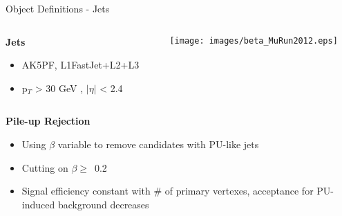 \documentclass{beamer}
\begin{document}
\begin{frame}{Object Definitions - Jets}
  \begin{columns}
    \begin{column}{0.4\textwidth}
      {\bf Jets}
      \begin{itemize}
      \item
        AK5PF, L1FastJet+L2+L3  %
      \item
        p$_{T}$ > 30 GeV , $|\eta|$ < 2.4
      \end{itemize}
    \end{column}
    
    \begin{column}{0.6\textwidth}
      \texttt{[image: images/beta\_MuRun2012.eps]}
    \end{column}
  \end{columns}

  {\bf Pile-up Rejection}
  \begin{itemize}
  \item
    Using $\beta$ variable to remove candidates with PU-like jets 
  \item
    Cutting on $\beta \geq$~0.2
  \item
    Signal efficiency constant with \# of primary vertexes, acceptance for PU-induced background decreases
  \end{itemize}
\end{frame}
\end{document}
